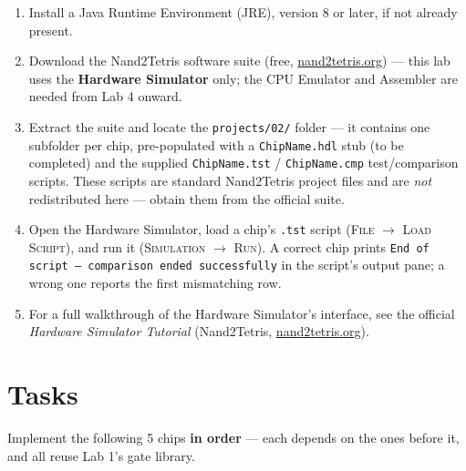 \documentclass[11pt]{article}
\begin{document}
\begin{enumerate}
  \item Install a Java Runtime Environment (JRE), version 8 or later, if not already present.
  \item Download the Nand2Tetris software suite (free, \url{nand2tetris.org}) --- this lab uses the \textbf{Hardware Simulator} only; the CPU Emulator and Assembler are needed from Lab 4 onward.
  \item Extract the suite and locate the \texttt{projects/02/} folder --- it contains one subfolder per chip, pre-populated with a \texttt{ChipName.hdl} stub (to be completed) and the supplied \texttt{ChipName.tst} / \texttt{ChipName.cmp} test/comparison scripts. These scripts are standard Nand2Tetris project files and are \emph{not} redistributed here --- obtain them from the official suite.
  \item Open the Hardware Simulator, load a chip's \texttt{.tst} script (\textsc{File} $\to$ \textsc{Load Script}), and run it (\textsc{Simulation} $\to$ \textsc{Run}). A correct chip prints \texttt{End of script --- comparison ended successfully} in the script's output pane; a wrong one reports the first mismatching row.
  \item For a full walkthrough of the Hardware Simulator's interface, see the official \emph{Hardware Simulator Tutorial} (Nand2Tetris, \url{nand2tetris.org}).
\end{enumerate}

\section{Tasks}
\label{sec:tasks}

Implement the following 5 chips \textbf{in order} --- each depends on the ones before it, and all reuse Lab 1's gate library.
\end{document}
